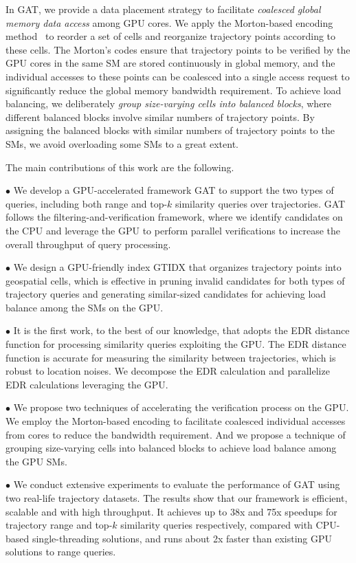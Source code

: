 \documentclass[10pt,conference,letterpaper]{IEEEtran}
\newcommand{\frname}{GAT\xspace }
\newcommand{\idxname}{GTIDX\xspace }
\begin{document}
In \frname, we provide a data placement strategy to facilitate \emph{coalesced global memory data access} among GPU cores.
We apply the Morton-based encoding method~\cite{morton1966computer} to reorder a set of cells and reorganize trajectory points according to these cells.
The Morton's codes ensure that trajectory points to be verified by the GPU cores in the same SM are stored continuously in global memory, and the individual accesses to these points can be coalesced into a single access request to significantly reduce the global memory bandwidth requirement.
To achieve load balancing, we deliberately \emph{group size-varying cells into balanced blocks}, where different balanced blocks involve similar numbers of trajectory points. By assigning the balanced blocks with similar numbers of trajectory points to the SMs, we avoid overloading some SMs to a great extent.


The main contributions of this work are the following.


$\bullet$ We develop a GPU-accelerated framework \frname to support the two types of queries, including both range and top-$k$ similarity queries over trajectories. \frname follows the filtering-and-verification framework, where we identify candidates on the CPU and leverage the GPU to perform parallel verifications to increase the overall throughput of query processing.

$\bullet$ We design a GPU-friendly index \idxname that organizes trajectory points into geospatial cells, which is effective in pruning invalid candidates for both types of trajectory queries and generating similar-sized candidates for achieving load balance among the SMs on the GPU.

$\bullet$ It is the first work, to the best of our knowledge, that adopts the EDR distance function for processing similarity queries exploiting the GPU. The EDR distance function is accurate for measuring the similarity between trajectories, which is robust to location noises. We decompose the EDR calculation and parallelize EDR  calculations leveraging the GPU.

$\bullet$ We propose two techniques of accelerating the verification process on the GPU. We employ the Morton-based encoding to facilitate coalesced individual accesses from cores to reduce the bandwidth requirement. And we propose a technique of grouping size-varying cells into balanced blocks to achieve load balance among the GPU SMs.

$\bullet$ We conduct extensive experiments to evaluate the performance of \frname using two real-life trajectory datasets. The results show that
our framework is efficient, scalable and with high throughput. It achieves up to 38x and 75x speedups for trajectory range and top-$k$ similarity queries respectively, compared with CPU-based single-threading solutions, and runs about 2x faster than existing GPU solutions to range queries.
\end{document}
